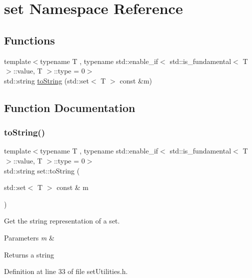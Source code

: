 \hypertarget{namespaceset}{}\section{set Namespace Reference}
\label{namespaceset}
\subsection*{Functions}
\begin{DoxyCompactItemize}
\item 
{\footnotesize template$<$typename T , typename std\+::enable\+\_\+if$<$ std\+::is\+\_\+fundamental$<$ T $>$\+::value, T $>$\+::type  = 0$>$ }\\std\+::string \hyperlink{namespaceset_a61f35fff33becca4522a3f0a22ee8dfc}{to\+String} (std\+::set$<$ T $>$ const \&m)
\end{DoxyCompactItemize}


\subsection{Function Documentation}
\mbox{\label{namespaceset_a61f35fff33becca4522a3f0a22ee8dfc}} 
\subsubsection{\texorpdfstring{to\+String()}{toString()}}
{\footnotesize\ttfamily template$<$typename T , typename std\+::enable\+\_\+if$<$ std\+::is\+\_\+fundamental$<$ T $>$\+::value, T $>$\+::type  = 0$>$ \\
std\+::string set\+::to\+String (\begin{DoxyParamCaption}\item[{std\+::set$<$ T $>$ const \&}]{m }\end{DoxyParamCaption})}

Get the string representation of a set.


\begin{DoxyParams}{Parameters}
{\em m} & \\
\hline
\end{DoxyParams}
\begin{DoxyReturn}{Returns}
a string 
\end{DoxyReturn}


Definition at line 33 of file set\+Utilities.\+h.

